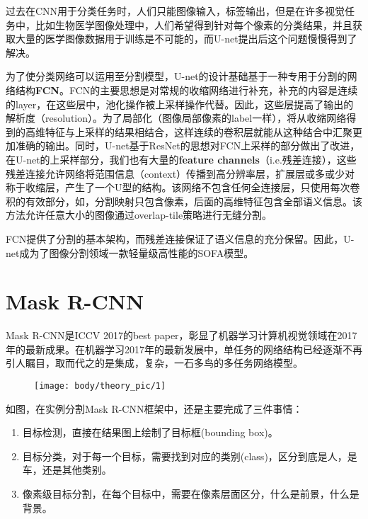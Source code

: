 过去在CNN用于分类任务时，人们只能图像输入，标签输出，但是在许多视觉任务中，比如生物医学图像处理中，人们希望得到针对每个像素的分类结果，并且获取大量的医学图像数据用于训练是不可能的，而U-net提出后这个问题慢慢得到了解决。

为了使分类网络可以运用至分割模型，U-net的设计基础基于一种专用于分割的网络结构\textbf{FCN}。FCN的主要思想是对常规的收缩网络进行补充，补充的内容是连续的layer，在这些层中，池化操作被上采样操作代替。因此，这些层提高了输出的解析度（resolution）。为了局部化（图像局部像素的label一样），将从收缩网络得到的高维特征与上采样的结果相结合，这样连续的卷积层就能从这种结合中汇聚更加准确的输出。同时，U-net基于ResNet的思想对FCN上采样的部分做出了改进，在U-net的上采样部分，我们也有大量的\textbf{feature
channels}（i.e.残差连接），这些残差连接允许网络将范围信息（context）传播到高分辨率层，扩展层或多或少对称于收缩层，产生了一个U型的结构。该网络不包含任何全连接层，只使用每次卷积的有效部分，如，分割映射只包含像素，后面的高维特征包含全部语义信息。该方法允许任意大小的图像通过overlap-tile策略进行无缝分割。

FCN提供了分割的基本架构，而残差连接保证了语义信息的充分保留。因此，U-net成为了图像分割领域一款轻量级高性能的SOFA模型。

\section{Mask R-CNN}\label{mask-r-cnn}

Mask R-CNN是ICCV 2017的best
paper，彰显了机器学习计算机视觉领域在2017年的最新成果。在机器学习2017年的最新发展中，单任务的网络结构已经逐渐不再引人瞩目，取而代之的是集成，复杂，一石多鸟的多任务网络模型。

\begin{figure}[htbp]
\centering
\texttt{[image: body/theory\_pic/1]}
\caption{}
\label{fig::theory11}
\end{figure}

如图，在实例分割Mask R-CNN框架中，还是主要完成了三件事情：

\begin{enumerate}
\def\labelenumi{\arabic{enumi}.}
\tightlist
\item
  目标检测，直接在结果图上绘制了目标框(bounding box)。
\item
  目标分类，对于每一个目标，需要找到对应的类别(class)，区分到底是人，是车，还是其他类别。
\item
  像素级目标分割，在每个目标中，需要在像素层面区分，什么是前景，什么是背景。
\end{enumerate}

